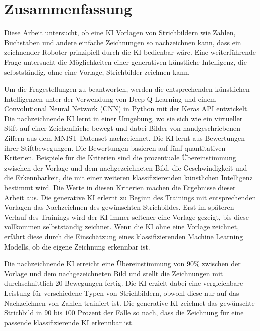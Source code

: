 \chapter{Zusammenfassung}\label{zusammenfassung}

Diese Arbeit untersucht, ob eine KI Vorlagen von Strichbildern wie Zahlen,
Buchstaben und andere einfache Zeichnungen so nachzeichnen kann, dass ein
zeichnender Roboter prinzipiell durch die KI bedienbar wäre. Eine weiterführende
Frage untersucht die Möglichkeiten einer generativen künstliche Intelligenz, die
selbstständig, ohne eine Vorlage, Strichbilder zeichnen kann.
 
Um die Fragestellungen zu beantworten, werden die entsprechenden künstlichen
Intelligenzen unter der Verwendung von Deep Q-Learning und einem Convolutional
Neural Network (CNN) in Python mit der Keras API entwickelt. Die nachzeichnende
KI lernt in einer Umgebung, wo sie sich wie ein virtueller Stift auf einer
Zeichenfläche bewegt und dabei Bilder von handgeschriebenen Ziffern aus dem
MNIST Datenset nachzeichnet. Die KI lernt aus Bewertungen ihrer Stiftbewegungen.
Die Bewertungen basieren auf fünf quantitativen Kriterien. Beispiele für die
Kriterien sind die prozentuale Übereinstimmung zwischen der Vorlage und dem
nachgezeichneten Bild, die Geschwindigkeit und die Erkennbarkeit, die mit einer
weiteren klassifizierenden künstlichen Intelligenz bestimmt wird. Die Werte in
diesen Kriterien machen die Ergebnisse dieser Arbeit aus. Die generative KI
erlernt zu Beginn des Trainings mit entsprechenden Vorlagen das Nachzeichnen des
gewünschten Strichbildes. Erst im späteren Verlauf des Trainings wird der KI
immer seltener eine Vorlage gezeigt, bis diese vollkommen selbstständig
zeichnet. Wenn die KI ohne eine Vorlage zeichnet, erfährt diese durch die
Einschätzung eines klassifizierenden Machine Learning Modells, ob die eigene
Zeichnung erkennbar ist.

Die nachzeichnende KI erreicht eine Übereinstimmung von $90\%$ zwischen der
Vorlage und dem nachgezeichneten Bild und stellt die Zeichnungen mit
durchschnittlich $20$ Bewegungen fertig. Die KI erzielt dabei eine vergleichbare
Leistung für verschiedene Typen von Strichbildern, obwohl diese nur auf das
Nachzeichnen von Zahlen trainiert ist. Die generative KI zeichnet das gewünschte
Strichbild in $90$ bis $100$ Prozent der Fälle so nach, dass die Zeichnung für eine
passende klassifizierende KI erkennbar ist.

